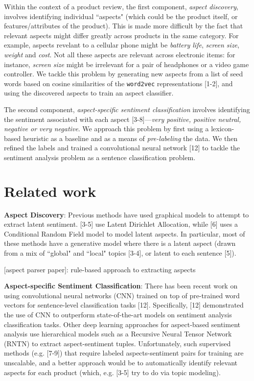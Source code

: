 \documentclass{article} %
\begin{document}
Within the context of a product review, the first component, \textit{aspect discovery}, involves identifying individual ``aspects" (which could be the product itself, or features/attributes of the product). This is made more difficult by the fact that relevant aspects might differ greatly across products in the same category. For example, aspects revelant to a cellular phone might be \textit{battery life}, \textit{screen size}, \textit{weight} and \textit{cost}. Not all these aspects are relevant across electronic items: for instance, \textit{screen size} might be irrelevant for a pair of headphones or a video game controller. We tackle this problem by generating new aspects from a list of seed words based on cosine similarities of the \texttt{word2vec} representations [1-2], and using the discovered aspects to train an aspect classifier.

The second component, \textit{aspect-specific sentiment classification} involves identifying the sentiment associated with each aspect [3-8]---\textit{very positive, positive neutral, negative or very negative}. We approach this problem by first using a lexicon-based heuristic as a baseline and as a means of \textit{pre-labeling} the data. We then refined the labels and trained a convolutional neural network [12] to tackle the sentiment analysis problem as a sentence classification problem.

\section{Related work}


\textbf{Aspect Discovery}: Previous methods have used graphical models to attempt to extract latent sentiment. [3-5] use Latent Dirichlet Allocation, while [6] uses a Conditional Random Field model to model latent aspects. In particular, most of these methods have a generative model where there is a latent aspect (drawn from a mix of ``global" and ``local" topics [3-4], or latent to each sentence [5]). 


[aspect parser paper]: rule-based approach to extracting aspects

\textbf{Aspect-specific Sentiment Classification}: There has been recent work on using convolutional neural networks (CNN) trained on top of pre-trained word vectors for sentence-level classification tasks [12]. Specifically, [12] demonstrated the use of CNN to outperform state-of-the-art models on sentiment analysis classification tasks. Other deep learning approaches for aspect-based sentiment analysis use hierarchical models such as a Recursive Neural Tensor Network (RNTN) to extract aspect-sentiment tuples. Unfortunately, such supervised methods (e.g. [7-9]) that require labeled aspects-sentiment pairs for training are unscalable, and a better approach would be to automatically identify relevant aspects for each product (which, e.g. [3-5] try to do via topic modeling). 
\end{document}
